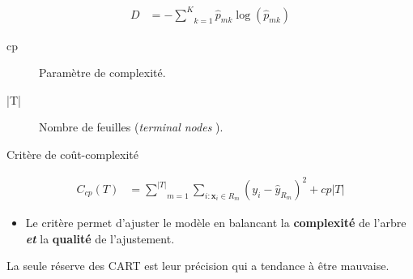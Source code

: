 \documentclass[10pt, french]{article}
\begin{document}
\begin{multicols*}{3}
\begin{definitionNOHFILL}

\begin{align*}
D	
	&=	-\underset{k = 1}{\overset{K}{\sum}} \hat{p}_{mk} \log(\hat{p}_{mk})
\end{align*}
\end{definitionNOHFILL}

\begin{definitionNOHFILL}
\begin{description}
	\item[cp]	Paramètre de complexité.
	\item[|T|]	Nombre de feuilles (\og \textit{terminal nodes} \fg{}).
	\item[Critère de coût-complexité]
\end{description}
\begin{align*}
	C_{cp}(T)	
	&=	\underset{m = 1}{\overset{| T |}{\sum}}\underset{i:\bm{x}_{i} \in R_{m}}{\sum} (y_{i} - \hat{y}_{R_{m}})^{2} + cp | T |
\end{align*}
\begin{itemize}[leftmargin = *]
	\item	Le critère permet d'ajuster le modèle en balancant la \textbf{complexité} de l'arbre \textbf{\textit{et}} la \textbf{qualité} de l'ajustement.
\end{itemize}
\end{definitionNOHFILL}

La seule réserve des CART est leur précision qui a tendance à être mauvaise.

\end{multicols*}
\end{document}
